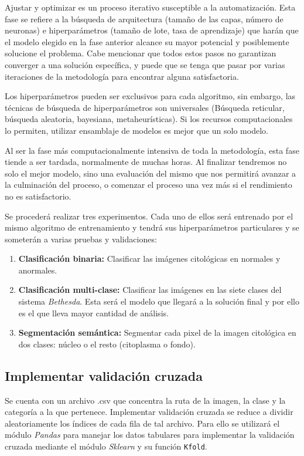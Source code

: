 Ajustar y optimizar es un proceso iterativo susceptible a la automatización.
Esta fase se refiere a la búsqueda de arquitectura (tamaño de las capas, número
de neuronas) e hiperparámetros (tamaño de lote, tasa de aprendizaje) que harán
que el modelo elegido en la fase anterior alcance su mayor potencial y
posiblemente solucione el problema. Cabe mencionar que todos estos pasos no
garantizan converger a una solución específica, y puede que se tenga que pasar
por varias iteraciones de la metodología para encontrar alguna satisfactoria.

Los hiperparámetros pueden ser exclusivos para cada algoritmo, sin embargo, las
técnicas de búsqueda de hiperparámetros son universales (Búsqueda reticular,
búsqueda aleatoria, bayesiana, metaheurísticas). Si los recursos computacionales
lo permiten, utilizar ensamblaje de modelos es mejor que un solo modelo.

Al ser la fase más computacionalmente intensiva de toda la metodología, esta
fase tiende a ser tardada, normalmente de muchas horas. Al finalizar tendremos
no solo el mejor modelo, sino una evaluación del mismo que nos permitirá avanzar
a la culminación del proceso, o comenzar el proceso una vez más si el
rendimiento no es satisfactorio.

Se procederá realizar tres experimentos. Cada uno de ellos será entrenado por el
mismo algoritmo de entrenamiento y tendrá sus hiperparámetros particulares y se
someterán a varias pruebas y validaciones:

\begin{enumerate}
    \item{\textbf{Clasificación binaria:}} Clasificar las imágenes citológicas
    en normales y anormales.
    \item{\textbf{Clasificación multi-clase:}} Clasificar las imágenes en las
    siete clases del sistema \emph{Bethesda}. Esta será el modelo que llegará a
    la solución final y por ello es el que lleva mayor cantidad de análisis.
    \item{\textbf{Segmentación semántica:}} Segmentar cada pixel de la imagen
    citológica en dos clases: núcleo o el resto (citoplasma o fondo).
\end{enumerate}

\subsection{Implementar validación cruzada}

Se cuenta con un archivo .csv que concentra la ruta de la imagen, la clase y la
categoría a la que pertenece. Implementar validación cruzada se reduce a dividir
aleatoriamente los índices de cada fila de tal archivo. Para ello se utilizará
el módulo \emph{Pandas} para manejar los datos tabulares para implementar la
validación cruzada mediante el módulo \emph{Sklearn} y su función
\texttt{Kfold}.

